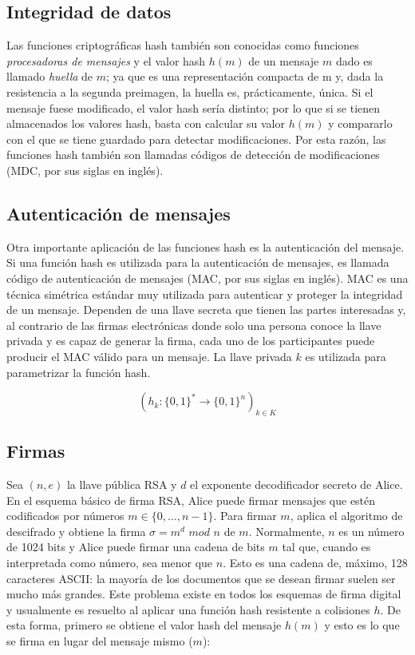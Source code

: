 \subsection{Integridad de datos}
Las funciones criptográficas hash también son conocidas como funciones
\textit{procesadoras de mensajes} y el valor hash $h(m)$ de un mensaje
$m$ dado es llamado \textit{huella} de $m$; ya que es una representación
compacta de m y, dada la resistencia a la segunda preimagen, la huella
es, prácticamente, única. Si el mensaje fuese modificado, el valor hash
sería distinto; por lo que si se tienen almacenados los valores hash,
basta con calcular su valor $h(m)$ y compararlo con el que se tiene
guardado para detectar modificaciones. Por esta razón, las funciones
hash también son llamadas códigos de detección de modificaciones (MDC,
por sus siglas en inglés).

\subsection{Autenticación de mensajes}
Otra importante aplicación de las funciones hash es la autenticación del mensaje. Si una función hash es utilizada para la autenticación de
mensajes, es llamada código de autenticación de mensajes (MAC, por sus
siglas en inglés). MAC es una técnica simétrica estándar muy utilizada para autenticar y proteger la integridad de un mensaje. Dependen de
una llave secreta que tienen las partes interesadas y, al contrario de las
firmas electrónicas donde solo una persona conoce la llave privada y es
capaz de generar la firma, cada uno de los participantes puede producir
el MAC válido para un mensaje. La llave privada $k$ es utilizada para
parametrizar la función hash.

\begin{equation}
  \label{funcion_hash_mac}
 	(h_k: \{0, 1\}^* \longrightarrow \{0,1\}^n)_{k \in K}
\end{equation}

\subsection{Firmas}
Sea $(n, e)$ la llave pública RSA y $d$ el exponente decodificador secreto
de Alice. En el esquema básico de firma RSA, Alice puede firmar mensajes
que estén codificados por números $ m \in \{0, \dots, n-1\}$. Para firmar
$m$, aplica el algoritmo de descifrado y obtiene la firma $\sigma = m^d$ $mod$ $n$ de $m$.
Normalmente, $n$ es un número de 1024 bits y Alice puede firmar una cadena
de bits $m$ tal que, cuando es interpretada como número, sea menor que
$n$. Esto es una cadena de, máximo, 128 caracteres ASCII: la mayoría de
los documentos que se desean firmar suelen ser mucho más grandes. Este
problema existe en todos los esquemas de firma digital y usualmente es
resuelto al aplicar una función hash resistente a colisiones $h$.
De esta forma, primero se obtiene el valor hash del mensaje $h(m)$ y esto
es lo que se firma en lugar del mensaje mismo ($m$):

